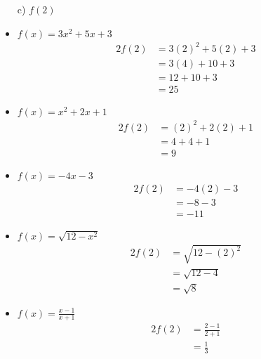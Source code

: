 \documentclass{templateNote}
\begin{document}
\begin{itemize}
    \item[c)] $f(2)$
    \item $f(x) = 3x^2 + 5x + 3$
    \begin{alignat*}{2}
        f(2) &= 3(2)^2 + 5(2) + 3 \\
        &= 3(4) + 10 + 3 \\
        &= 12 + 10 + 3 \\
        &= 25
    \end{alignat*}
    \item $f(x) = x^2 + 2x + 1$ 
    \begin{alignat*}{2}
        f(2) &= (2)^2 + 2(2) + 1 \\
        &= 4 + 4 + 1 \\
        &= 9
    \end{alignat*}
    \item $f(x) = -4x - 3$
    \begin{alignat*}{2}
        f(2) &= -4(2) - 3 \\
        &= -8 - 3 \\
        &= -11
    \end{alignat*}
    \item $f(x) = \sqrt{12 - x^2}$  
    \begin{alignat*}{2}
        f(2) &= \sqrt{12 - (2)^2} \\
        &= \sqrt{12 - 4} \\
        &= \sqrt{8}
    \end{alignat*}
    \item $f(x) = \frac{x-1}{x+1}$
    \begin{alignat*}{2}
        f(2) &= \frac{2 - 1}{2 + 1} \\
        &= \frac{1}{3}
    \end{alignat*}
\end{itemize}
\end{document}
